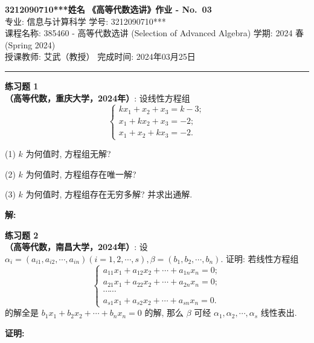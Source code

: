 \documentclass[a4paper, 11pt]{article}
\newenvironment{problem}[2][练习题]
    { \begin{mdframed}[backgroundcolor=gray!5] \textbf{#1 #2} \\}
    {  \end{mdframed}}
\newenvironment{solution}
    {\textbf{解:}}
    {}
\newenvironment{solution2}
    {\textbf{证明:}}
    {}
\begin{document}
\noindent
\large\textbf{3212090710***\quad 姓名} \hfill \textbf{《高等代数选讲》作业 - No.~\Huge{03}}   \\
专业: 信息与计算科学 \hfill 学号: 3212090710*** \\
\normalsize 课程名称: 385460 - 高等代数选讲 (Selection of Advanced Algebra) \hfill 学期: 2024 春 (Spring 2024)\\
授课教师: 艾武（教授） \hfill 完成时间: 2024年03月25日 \\
\noindent\rule{7in}{1.8pt}

\begin{problem}{1}
\textbf{（高等代数，重庆大学，2024年）}: 设线性方程组
$$
\left\{\begin{array}{l}
k x_1+x_2+x_3=k-3 ; \\
x_1+k x_2+x_3=-2 ; \\
x_1+x_2+k x_3=-2 .
\end{array}\right.
$$

(1) $k$ 为何值时, 方程组无解?

(2) $k$ 为何值时, 方程组存在唯一解?

(3) $k$ 为何值时, 方程组存在无穷多解? 并求出通解.
\end{problem}

\begin{solution}

\end{solution} 


\begin{problem}{2}
\textbf{（高等代数，南昌大学，2024年）}: 设 $\alpha_i=\left(a_{i 1}, a_{i 2}, \cdots, a_{i n}\right)(i=1,2, \cdots, s), \beta=\left(b_1, b_2, \cdots, b_n\right)$. 证明: 若线性方程组
$$
\left\{\begin{array}{c}
a_{11} x_1+a_{12} x_2+\cdots+a_{1 n} x_n=0 ; \\
a_{21} x_1+a_{22} x_2+\cdots+a_{2 n} x_n=0 ; \\
\cdots \cdots \\
a_{s 1} x_1+a_{s 2} x_2+\cdots+a_{s n} x_n=0 .
\end{array}\right.
$$
的解全是 $b_1 x_1+b_2 x_2+\cdots+b_n x_n=0$ 的解, 那么 $\beta$ 可经 $\alpha_1, \alpha_2, \cdots, \alpha_s$ 线性表出.
\end{problem}

\begin{solution2}


\end{solution2} 





\end{document}
